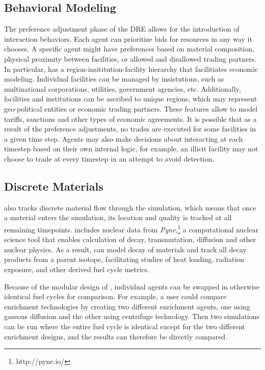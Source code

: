 \subsection{Behavioral Modeling}
The preference adjustment phase of the \gls{DRE} allows for the introduction of interaction behaviors.  Each agent can prioritize bids for resources in any way it chooses. A specific agent might have preferences based on material composition, physical proximity between facilities, or allowed and disallowed trading partners. In particular, \Cyclus has a region-insititution-facility hierarchy that facilitiates economic modeling\cite{oliver_thesis_2009}.  Individual facilities can be managed by insistutions, such as multinational corporations, utilities, government agencies, etc.  Additionally, facilities and institutions can be ascribed to unique regions, which may represent geo-political entities or economic trading partners. These features allow \Cyclus to model tariffs, sanctions and other types of economic agreements.  It is possible that as a result of the preference adjustments, no trades are executed for some facilities in a given time step.  Agents may also make decisions about interacting at each timestep based on their own internal logic, for example, an illicit facility may not choose to trade at every timestep in an attempt to avoid detection. 

\subsection{Discrete Materials}
\Cyclus also tracks discrete material flow through the simulation, which means that once a material enters the simulation, its location and quality is tracked at all remaining timepoints\cite{huff_thesis_?}.  \Cyclus includes nuclear data from \emph{Pyne},\footnote{http://pyne.io/} a computational nuclear science tool that enables calculation of decay, transmutation, diffusion and other nuclear physics\cite{scopatz_pyne_2012}. As a result, \Cyclus can  model decay of materials and track all decay products from a parent isotope, facilitating studies of heat loading, radiation exposure, and other derived fuel cycle metrics\cite{scopatz_cymetric_2015}.

Because of the modular design of \Cyclus, individual agents can be swapped in otherwise identical fuel cycles for comparison. For example, a user could compare enrichment technologies by creating two different enrichment agents, one using gaseous diffusion and the other using centrifuge technology. Then two simulations can be run where the entire fuel cycle is identical except for the two different enrichment designs, and the results can therefore be directly compared.
